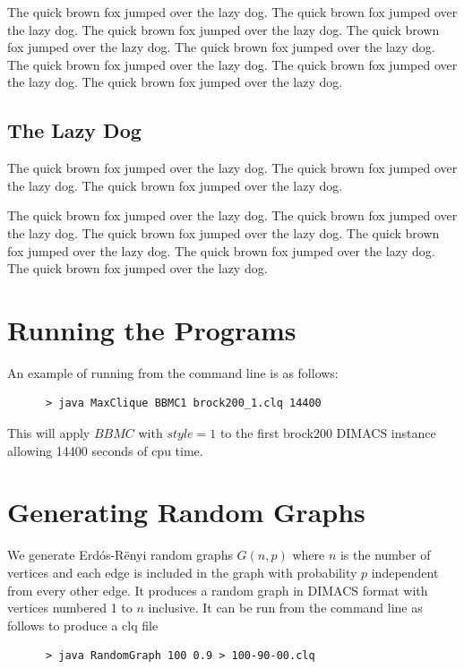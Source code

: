 \documentclass{l4proj}
\begin{document}
The quick brown fox jumped over the lazy dog.
The quick brown fox jumped over the lazy dog.
The quick brown fox jumped over the lazy dog.
The quick brown fox jumped over \cite{ckt} the lazy dog.
The quick brown fox jumped over the lazy dog.
The quick brown fox jumped over the lazy dog.
The quick brown fox jumped over the lazy dog.
The quick brown fox jumped over the lazy dog.

\section{The Lazy Dog}
The quick brown fox jumped over the lazy dog.
The quick brown fox jumped over the lazy dog.
The quick brown fox jumped over the lazy dog.

The quick brown fox jumped over the lazy dog.
The quick brown fox \cite{am97} jumped over the lazy dog.
The quick brown fox jumped over the lazy dog.
The quick brown fox jumped over the lazy dog.
The quick brown fox jumped over the lazy dog.
The quick brown fox jumped over the lazy dog.

\begin{appendices}

\chapter{Running the Programs}
An example of running from the command line is as follows:
\begin{verbatim}
      > java MaxClique BBMC1 brock200_1.clq 14400
\end{verbatim}
This will apply $BBMC$ with $style = 1$ to the first brock200 DIMACS instance allowing 14400 seconds of cpu time.

\chapter{Generating Random Graphs}
\label{sec:randomGraph}
We generate Erd\'{o}s-R\"{e}nyi random graphs $G(n,p)$ where $n$ is the number of vertices and
each edge is included in the graph with probability $p$ independent from every other edge. It produces
a random graph in DIMACS format with vertices numbered 1 to $n$ inclusive. It can be run from the command line as follows to produce 
a clq file
\begin{verbatim}
      > java RandomGraph 100 0.9 > 100-90-00.clq
\end{verbatim}
\end{appendices}




\end{document}
